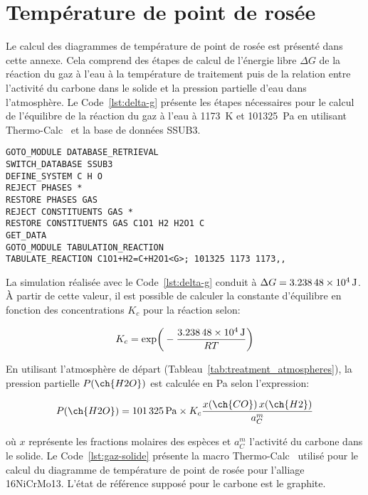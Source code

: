\chapter{Température de point de rosée}
\label{an:dew-point}

Le calcul des diagrammes de température de point de rosée est présenté dans cette annexe. Cela comprend des étapes de calcul de l'énergie libre $\Delta{}G$ de la réaction du gaz à l'eau  à la température de traitement puis de la relation entre l'activité du carbone dans le solide et la pression partielle d'eau dans l'atmosphère. Le Code~\ref{lst:delta-g} présente les étapes nécessaires pour le calcul de l'équilibre de la réaction du gaz à l'eau à \SI{1173}{\kelvin} et \SI{101325}{\pascal} en utilisant Thermo-Calc~\cite{Andersson2002,Borgenstam2000} et la base de données SSUB3.

\begin{lstlisting}[caption={\label{lst:delta-g}Calcul de l'équilibre de la réaction du gaz à l'eau.}]
GOTO_MODULE DATABASE_RETRIEVAL
SWITCH_DATABASE SSUB3
DEFINE_SYSTEM C H O
REJECT PHASES *
RESTORE PHASES GAS
REJECT CONSTITUENTS GAS *
RESTORE CONSTITUENTS GAS C1O1 H2 H2O1 C 
GET_DATA
GOTO_MODULE TABULATION_REACTION
TABULATE_REACTION C1O1+H2=C+H2O1<G>; 101325 1173 1173,,
\end{lstlisting}

La simulation réalisée avec le Code~\ref{lst:delta-g} conduit à $\Delta{}G{}=\SI{3.23848E+04}{\joule}$. À partir de cette valeur, il est possible de calculer la constante d'équilibre en fonction des concentrations $K_{c}$ pour la réaction selon:

\[
K_{c}=\exp\biggr(-\frac{\SI{3.23848E+04}{\joule}}{RT}\biggr)
\]
 
En utilisant l'atmosphère de départ  (Tableau~\ref{tab:treatment_atmospheres}), la pression partielle $P(\ch{H2O})$ est calculée \textendash{} en \si{\pascal} \textendash{} selon l'expression:

\[
P(\ch{H2O})=\SI{101325}{\pascal}\times{}K_{c}{}\frac{x(\ch{CO})\,x(\ch{H2})}{a_{C}^{m}}
\]

\noindent où $x$ représente les fractions molaires des espèces et $a_{C}^{m}$ l'activité du carbone dans le solide. Le Code~\ref{lst:gaz-solide} présente la macro Thermo-Calc~\cite{Andersson2002,Borgenstam2000} utilisé pour le calcul du diagramme de température de point de rosée pour l'alliage 16NiCrMo13. L'état de référence supposé pour le carbone est le graphite.


